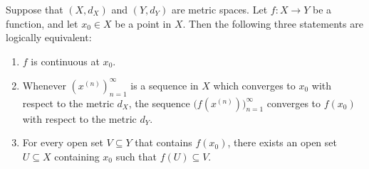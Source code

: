 \begin{thm}\label{ii:2.1.4}
  Suppose that \((X, d_X)\) and \((Y, d_Y)\) are metric spaces.
  Let \(f : X \to Y\) be a function, and let \(x_0 \in X\) be a point in \(X\).
  Then the following three statements are logically equivalent:
  \begin{enumerate}
    \item\label{ii:2.1.4.a} \(f\) is continuous at \(x_0\).
    \item\label{ii:2.1.4.b} Whenever \((x^{(n)})_{n = 1}^\infty\) is a sequence in \(X\) which converges to \(x_0\) with respect to the metric \(d_X\), the sequence \(\big(f(x^{(n)})\big)_{n = 1}^\infty\) converges to \(f(x_0)\) with respect to the metric \(d_Y\).
    \item\label{ii:2.1.4.c} For every open set \(V \subseteq Y\) that contains \(f(x_0)\), there exists an open set \(U \subseteq X\) containing \(x_0\) such that \(f(U) \subseteq V\).
  \end{enumerate}
\end{thm}

